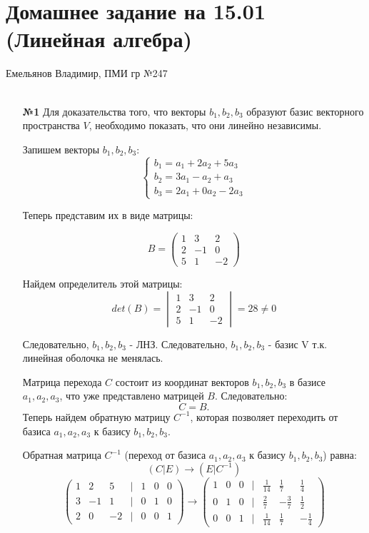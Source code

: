 \documentclass[a4paper]{article}
\newcommand{\case}[1]{\begin{cases} #1 \end{cases}}
\begin{document}
\section*{Домашнее задание на 15.01 (Линейная алгебра)}
 {\large Емельянов Владимир, ПМИ гр №247}\\\\
\begin{enumerate}
    \item[\textbf{№1}]Для доказательства того, что векторы $ b_1, b_2, b_3 $ образуют базис векторного пространства $ V $, необходимо показать, что они линейно независимы.
    
    
Запишем векторы $ b_1, b_2, b_3 $:
    $$\case{
    b_1 = a_1 + 2a_2 + 5a_3\\
    b_2 = 3a_1 - a_2 + a_3\\
    b_3 = 2a_1 + 0a_2 - 2a_3}
    $$
    
    Теперь представим их в виде матрицы:

    $$
    B = 
    \begin{pmatrix}
    1 & 3 & 2 \\
    2 & -1 & 0 \\
    5 & 1 & -2
    \end{pmatrix}
    $$
        
    Найдем определитель этой матрицы:
    \[
    det(B) = 
    \begin{vmatrix}
    1 & 3 & 2 \\
    2 & -1 & 0 \\
    5 & 1 & -2
    \end{vmatrix}
    =28 \neq 0\]

    Следовательно, $b_1, b_2, b_3$ - ЛНЗ. Следовательно, $b_1, b_2, b_3$ - базис V т.к. линейная оболочка не менялась.
    
    Матрица перехода \( C \) состоит из координат векторов \( b_1, b_2, b_3 \) в базисе \( a_1, a_2, a_3 \), что уже представлено матрицей \( B \). Следовательно:
    \[
    C = B.
    \]
    Теперь найдем обратную матрицу \( C^{-1} \), которая позволяет переходить от базиса \( a_1, a_2, a_3 \) к базису \( b_1, b_2, b_3 \).

    
    Обратная матрица \( C^{-1} \) (переход от базиса \( a_1, a_2, a_3 \) к базису \( b_1, b_2, b_3 \)) равна:
    $$(C | E) \to (E|C^{-1})$$
    $$ \begin{pmatrix}
        1 & 2 & 5 & | & 1 & 0 & 0 \\
        3 & -1 & 1& | & 0 & 1 & 0\\
        2 & 0 & -2& | & 0 & 0 & 1
        \end{pmatrix} \to \begin{pmatrix}
             1 & 0 & 0 & | &\frac{1}{14} & \frac{1}{7} & \frac{1}{4} \\
             0 & 1 & 0 & | &\frac{2}{7} & -\frac{3}{7} & \frac{1}{2} \\
             0 & 0 & 1 & | &\frac{1}{14} & \frac{1}{7} & -\frac{1}{4}
            \end{pmatrix}$$


\end{enumerate}
\end{document}
